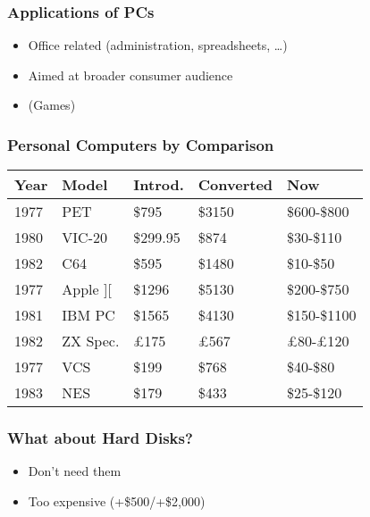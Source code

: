 \documentclass[aspectratio=43]{uva-inf-presentation}
\begin{document}
\begin{frame}
\frametitle{Applications of PCs}

\begin{itemize}
\item Office related (administration, spreadsheets, \dots)
\item Aimed at broader consumer audience
\item (Games)
\end{itemize}

\end{frame}


\begin{frame}
\frametitle{Personal Computers by Comparison}

\begin{tabular}{|l|l|l|l|l|}
\hline Year & Model & Introd. & Converted & Now \\ \hline
1977 & PET & \$795 & \$3150 & \$600-\$800 \\
1980 & VIC-20 & \$299.95 & \$874 & \$30-\$110 \\
1982 & C64 & \$595 & \$1480 & \$10-\$50 \\ \hline
1977 & Apple ][ & \$1296 & \$5130 & \$200-\$750 \\
1981 & IBM PC & \$1565 & \$4130 & \$150-\$1100 \\
1982 & ZX Spec. & \pounds 175 & \pounds 567 & \pounds 80-\pounds 120 \\ \hline
1977 & VCS & \$199 & \$768 & \$40-\$80 \\
1983 & NES & \$179 & \$433 & \$25-\$120 \\ \hline
\end{tabular}

\end{frame}


\begin{frame}
\frametitle{What about Hard Disks?}

\begin{itemize}
\item Don't need them
\item Too expensive (+\$500/+\$2,000)
\end{itemize}

\end{frame}

\end{document}
